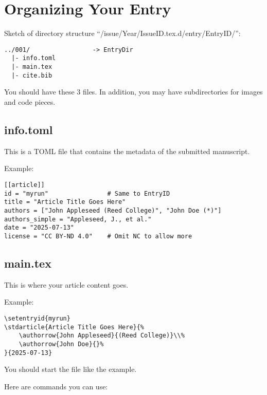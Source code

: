 \section{Organizing Your Entry}
Sketch of directory structure ``/issue/Year/IssueID.tex.d/entry/EntryID/'':

\begin{lstlisting}
../001/                 -> EntryDir
  |- info.toml
  |- main.tex
  |- cite.bib
\end{lstlisting}

You should have these 3 files.
In addition, you may have subdirectories for images and code pieces.

\subsection{info.toml}
This is a TOML file that contains the metadata of the submitted manuscript.

Example:
\begin{lstlisting}
[[article]]
id = "myrun"                # Same to EntryID
title = "Article Title Goes Here"
authors = ["John Appleseed (Reed College)", "John Doe (*)"]
authors_simple = "Appleseed, J., et al."
date = "2025-07-13"
license = "CC BY-ND 4.0"    # Omit NC to allow more
\end{lstlisting}

\subsection{main.tex}
This is where your article content goes.

Example:
\begin{lstlisting}
\setentryid{myrun}
\stdarticle{Article Title Goes Here}{%
    \authorrow{John Appleseed}{(Reed College)}\\%
    \authorrow{John Doe}{}%
}{2025-07-13}
\end{lstlisting}

You should start the file like the example.

Here are commands you can use:


